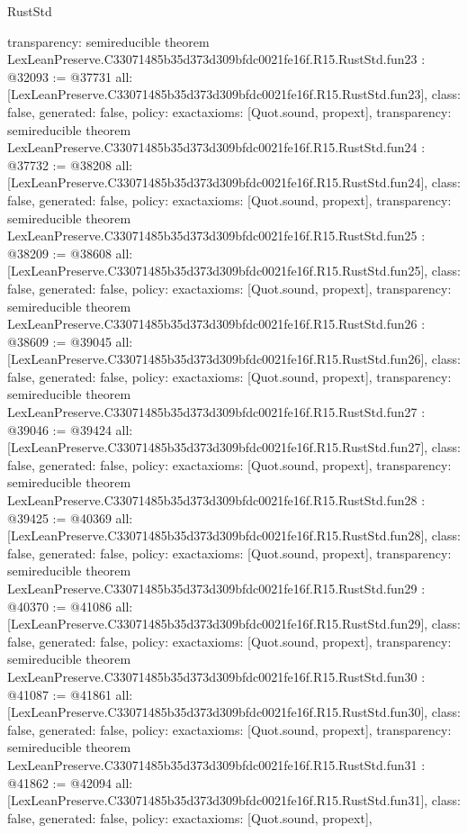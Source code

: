 \begin{lexlean}{RustStd}
\begin{coremodule}
{  transparency: semireducible
}
theorem LexLeanPreserve.C33071485b35d373d309bfdc0021fe16f.R15.RustStd.fun23 : @32093 := @37731 {
  all: [LexLeanPreserve.C33071485b35d373d309bfdc0021fe16f.R15.RustStd.fun23],
  class: false,
  generated: false,
  policy: exact{axioms: [Quot.sound, propext]},
  transparency: semireducible
}
theorem LexLeanPreserve.C33071485b35d373d309bfdc0021fe16f.R15.RustStd.fun24 : @37732 := @38208 {
  all: [LexLeanPreserve.C33071485b35d373d309bfdc0021fe16f.R15.RustStd.fun24],
  class: false,
  generated: false,
  policy: exact{axioms: [Quot.sound, propext]},
  transparency: semireducible
}
theorem LexLeanPreserve.C33071485b35d373d309bfdc0021fe16f.R15.RustStd.fun25 : @38209 := @38608 {
  all: [LexLeanPreserve.C33071485b35d373d309bfdc0021fe16f.R15.RustStd.fun25],
  class: false,
  generated: false,
  policy: exact{axioms: [Quot.sound, propext]},
  transparency: semireducible
}
theorem LexLeanPreserve.C33071485b35d373d309bfdc0021fe16f.R15.RustStd.fun26 : @38609 := @39045 {
  all: [LexLeanPreserve.C33071485b35d373d309bfdc0021fe16f.R15.RustStd.fun26],
  class: false,
  generated: false,
  policy: exact{axioms: [Quot.sound, propext]},
  transparency: semireducible
}
theorem LexLeanPreserve.C33071485b35d373d309bfdc0021fe16f.R15.RustStd.fun27 : @39046 := @39424 {
  all: [LexLeanPreserve.C33071485b35d373d309bfdc0021fe16f.R15.RustStd.fun27],
  class: false,
  generated: false,
  policy: exact{axioms: [Quot.sound, propext]},
  transparency: semireducible
}
theorem LexLeanPreserve.C33071485b35d373d309bfdc0021fe16f.R15.RustStd.fun28 : @39425 := @40369 {
  all: [LexLeanPreserve.C33071485b35d373d309bfdc0021fe16f.R15.RustStd.fun28],
  class: false,
  generated: false,
  policy: exact{axioms: [Quot.sound, propext]},
  transparency: semireducible
}
theorem LexLeanPreserve.C33071485b35d373d309bfdc0021fe16f.R15.RustStd.fun29 : @40370 := @41086 {
  all: [LexLeanPreserve.C33071485b35d373d309bfdc0021fe16f.R15.RustStd.fun29],
  class: false,
  generated: false,
  policy: exact{axioms: [Quot.sound, propext]},
  transparency: semireducible
}
theorem LexLeanPreserve.C33071485b35d373d309bfdc0021fe16f.R15.RustStd.fun30 : @41087 := @41861 {
  all: [LexLeanPreserve.C33071485b35d373d309bfdc0021fe16f.R15.RustStd.fun30],
  class: false,
  generated: false,
  policy: exact{axioms: [Quot.sound, propext]},
  transparency: semireducible
}
theorem LexLeanPreserve.C33071485b35d373d309bfdc0021fe16f.R15.RustStd.fun31 : @41862 := @42094 {
  all: [LexLeanPreserve.C33071485b35d373d309bfdc0021fe16f.R15.RustStd.fun31],
  class: false,
  generated: false,
  policy: exact{axioms: [Quot.sound, propext]},
}
\end{coremodule}
\end{lexlean}
